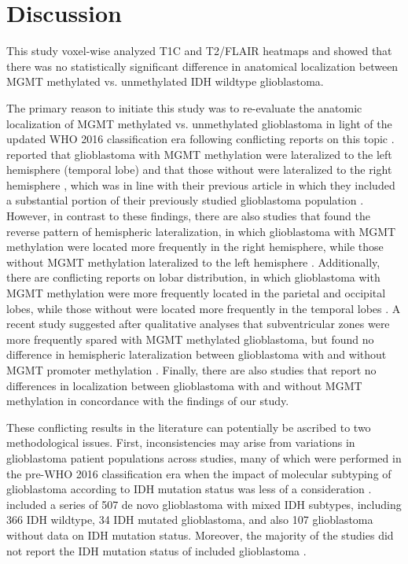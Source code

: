 \section{Discussion}

This study voxel-wise analyzed \gls{T1C} and \gls{T2}/\gls{FLAIR} heatmaps and showed that there was no statistically significant difference in anatomical localization between \gls{MGMT} methylated vs. unmethylated \gls{IDH} wildtype glioblastoma.

The primary reason to initiate this study was to re-evaluate the anatomic localization of \gls{MGMT} methylated vs. unmethylated glioblastoma in light of the updated \gls{WHO} 2016 classification era following conflicting reports on this topic \autocite{smits2017imaging}.
 reported that glioblastoma with \gls{MGMT} methylation were lateralized to the left hemisphere (temporal lobe) and that those without were lateralized to the right hemisphere \autocite{ellingson2013probabilistic}, which was in line with their previous article in which they included a substantial portion of their previously studied glioblastoma population \autocite{ellingson2012anatomic}.
However, in contrast to these findings, there are also studies that found the reverse pattern of hemispheric lateralization, in which glioblastoma with \gls{MGMT} methylation were located more frequently in the right hemisphere, while those without \gls{MGMT} methylation lateralized to the left hemisphere \autocite{wang2014anatomical}.
Additionally, there are conflicting reports on lobar distribution, in which glioblastoma with \gls{MGMT} methylation were more frequently located in the parietal and occipital lobes, while those without were located more frequently in the temporal lobes \autocite{eoli2007methylation}.
A recent study suggested after qualitative analyses that subventricular zones were more frequently spared with \gls{MGMT} methylated glioblastoma, but found no difference in hemispheric lateralization between glioblastoma with and without \gls{MGMT} promoter methylation \autocite{han2018structural}.
Finally, there are also studies that report no differences in localization between glioblastoma with and without \gls{MGMT} methylation \autocite{carillo2012relationship, drabycz2010analysis} in concordance with the findings of our study.

These conflicting results in the literature can potentially be ascribed to two methodological issues.
First, inconsistencies may arise from variations in glioblastoma patient populations across studies, many of which were performed in the pre-\gls{WHO} 2016 classification era when the impact of molecular subtyping of glioblastoma according to \gls{IDH} mutation status was less of a consideration \autocite{louis20162016}.
 included a series of 507 de novo glioblastoma with mixed \gls{IDH} subtypes, including 366 \gls{IDH} wildtype, 34 \gls{IDH} mutated glioblastoma, and also 107 glioblastoma without data on \gls{IDH} mutation status.
Moreover, the majority of the studies did not report the \gls{IDH} mutation status of included glioblastoma \autocite{ellingson2012anatomic,wang2014anatomical,eoli2007methylation,drabycz2010analysis}.

